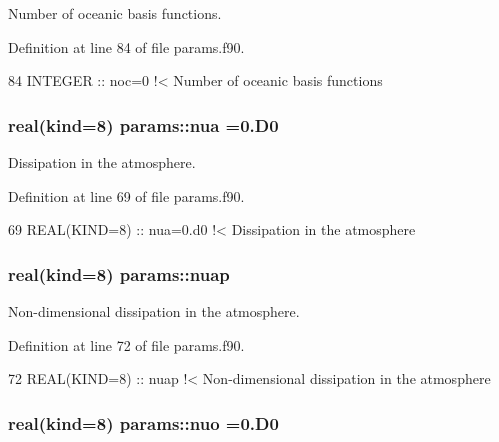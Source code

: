 Number of oceanic basis functions. 



Definition at line 84 of file params.\+f90.


\begin{DoxyCode}
84   \textcolor{keywordtype}{INTEGER} :: noc=0\textcolor{comment}{  !< Number of oceanic basis functions}
\end{DoxyCode}
\subsubsection[{\texorpdfstring{nua}{nua}}]{\setlength{\rightskip}{0pt plus 5cm}real(kind=8) params\+::nua =0.D0}\hypertarget{namespaceparams_a8421c6937257007fb96366980677061c}{}\label{namespaceparams_a8421c6937257007fb96366980677061c}


Dissipation in the atmosphere. 



Definition at line 69 of file params.\+f90.


\begin{DoxyCode}
69   \textcolor{keywordtype}{REAL(KIND=8)} :: nua=0.d0  \textcolor{comment}{!< Dissipation in the atmosphere}
\end{DoxyCode}
\subsubsection[{\texorpdfstring{nuap}{nuap}}]{\setlength{\rightskip}{0pt plus 5cm}real(kind=8) params\+::nuap}\hypertarget{namespaceparams_a3a0962facf5be13872568dd81f95453c}{}\label{namespaceparams_a3a0962facf5be13872568dd81f95453c}


Non-\/dimensional dissipation in the atmosphere. 



Definition at line 72 of file params.\+f90.


\begin{DoxyCode}
72   \textcolor{keywordtype}{REAL(KIND=8)} :: nuap\textcolor{comment}{      !< Non-dimensional dissipation in the atmosphere}
\end{DoxyCode}
\subsubsection[{\texorpdfstring{nuo}{nuo}}]{\setlength{\rightskip}{0pt plus 5cm}real(kind=8) params\+::nuo =0.D0}\hypertarget{namespaceparams_a49937b0c51e9f89ac9b2f332d387af2f}{}\label{namespaceparams_a49937b0c51e9f89ac9b2f332d387af2f}


